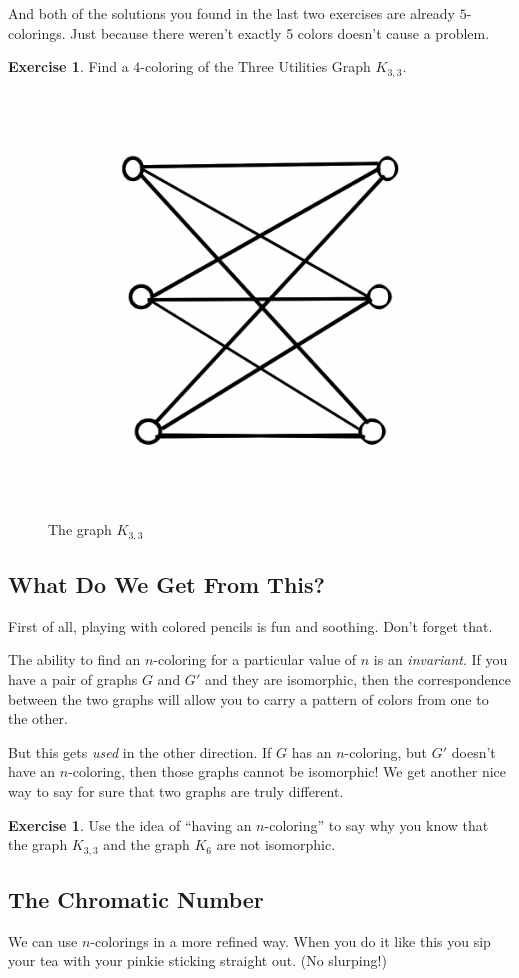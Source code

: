 \documentclass[12pt,letterpaper]{article}
\theoremstyle{definition}
\newtheorem{exercise}[question]{Exercise}
\begin{document}
And both of the solutions you found in the last two exercises are already $5$-colorings. Just because there 
weren't exactly 5 colors doesn't cause a problem.

\begin{exercise}
Find a $4$-coloring of the Three Utilities Graph $K_{3,3}$.
\end{exercise}

\begin{figure}[h]
\centering
\includegraphics[width=.3\textwidth]{images/k3,3.png}
\caption{The graph $K_{3,3}$}
\label{figure:k33}
\end{figure}


\subsection*{What Do We Get From This?}

First of all, playing with colored pencils is fun and soothing. Don't forget that.

The ability to find an $n$-coloring for a particular value of $n$ is an \emph{invariant}. If you have a pair of graphs
$G$ and $G'$ and they are isomorphic, then the correspondence between the two graphs will allow you to carry
a pattern of colors from one to the other.

But this gets \emph{used} in the other direction. If $G$ has an $n$-coloring, but $G'$ doesn't have an $n$-coloring, 
then those graphs cannot be isomorphic! We get another nice way to say for sure that two graphs are truly different.

\begin{exercise}
Use the idea of ``having an $n$-coloring'' to say why you know that the graph $K_{3,3}$ and the graph $K_6$ are
not isomorphic.
\end{exercise}


\subsection*{The Chromatic Number}

We can use $n$-colorings in a more refined way. When you do it like this you sip your tea with your pinkie sticking straight out. (No slurping!)
\end{document}
